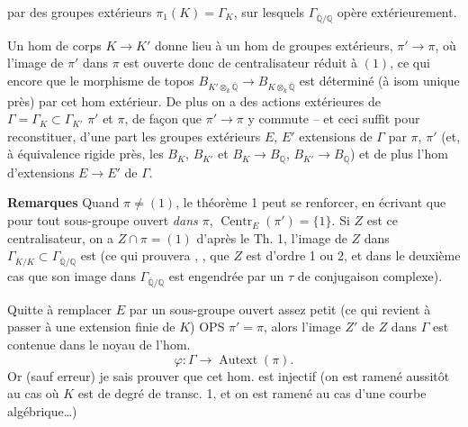 \documentclass[11pt,a4paper]{article}
\begin{document}
par des groupes  extérieurs $\pi_1(K) = \Gamma_K$, sur lesquels  $\Gamma_{\overline{\mathbb{Q}}/\mathbb{Q}}$ opère extérieurement.

Un hom de corps $K \to K'$ donne lieu à un hom de groupes extérieurs, \struck{\ill{}} $\pi' \to \pi$, où l'image de $\pi'$ dans $\pi$ est ouverte donc de centralisateur réduit à $(1)$, ce qui   encore que le morphisme de topos $B_{K' \otimes_k \overline{\mathbb{Q}}} \to B_{K \otimes_k \overline{\mathbb{Q}}}$ est déterminé (à isom unique près) par cet hom extérieur. De plus on a des actions extérieures de $\Gamma = \Gamma_K \subset \Gamma_{K'}$  $\pi'$ et $\pi$, de façon que $\pi' \to \pi$ y commute -- et ceci suffit pour reconstituer, d'une part les groupes extérieurs $E$, $E'$ extensions  de $\Gamma$ par $\pi$, $\pi'$ (et, à équivalence rigide près, les $B_K$, $B_{K'}$ et $B_K \to B_{\mathbb{Q}}$, $B_{K'} \to B_{\mathbb{Q}}$) et de plus l'hom d'extensions  $E \to E'$ de $\Gamma$.

\textbf{Remarques} Quand $\pi \neq (1)$,  le théorème 1 peut se renforcer,  en écrivant que pour tout sous-groupe  ouvert \emph{dans $\pi$}, $\operatorname{Centr}_E(\pi') = \{1\}$. Si $Z$ est ce centralisateur, on a $Z \cap \pi = (1)$ d'après le Th. 1,   l'image de $Z$ dans $\Gamma_{\overline{K}/K} \subset \Gamma_{\overline{\mathbb{Q}}/\mathbb{Q}}$ est   \struck{\ill{}} (ce qui prouvera , , que $Z$ est d'ordre 1 ou 2, et dans le deuxième cas que son image dans $\Gamma_{\overline{\mathbb{Q}}/\mathbb{Q}}$ est \struck{\ill{}} engendrée par un $\tau$ de conjugaison complexe).

Quitte à remplacer $E$ par un sous-groupe ouvert assez petit (ce qui revient à passer à une extension finie de $K$) OPS $\pi' = \pi$, alors l'image $Z'$ de $Z$ dans $\Gamma$ est contenue dans le noyau de l'hom.
\[
  \varphi : \Gamma \longrightarrow \operatorname{Autext}(\pi) .
\]
Or (sauf erreur) je sais prouver que cet hom. est injectif (on est ramené aussitôt au cas où $K$ est de degré de transc. 1, et on est ramené au cas  d'une courbe algébrique…)
\end{document}
